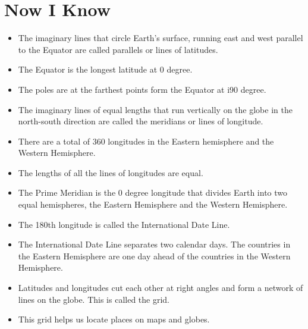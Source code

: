 \section{Now I Know}
\begin{itemize}
    \item The imaginary lines that circle Earth's surface, running east and west parallel to the Equator are called parallels or lines of latitudes.
    \item The Equator is the longest latitude at 0 degree.
    \item The poles are at the farthest points form the Equator at i90 degree.
    \item The imaginary lines of equal lengths that run vertically on the globe in the north-south direction are called the meridians or lines of longitude.
    \item There are a total of 360 longitudes in the Eastern hemisphere and the Western Hemisphere.
    \item The lengths of all the lines of longitudes are equal.
    \item The Prime Meridian is the 0 degree longitude that divides Earth into two equal hemispheres, the Eastern Hemisphere and the Western Hemisphere.
    \item The 180th longitude is called the International Date Line.
    \item The International Date Line separates two calendar days. The countries in the Eastern Hemisphere are one day ahead of the countries in the Western Hemisphere.
    \item Latitudes and longitudes cut each other at right angles and form a network of lines on the globe. This is called the grid.
    \item This grid helps us locate places on maps and globes.
\end{itemize}